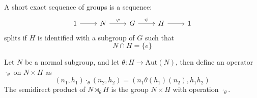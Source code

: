 \documentclass[openany]{book}
\begin{document}
\begin{defn}
    A short exact sequence of groups is a sequence:
    \[\begin{tikzcd}
        1 & N & G & H & 1
        \arrow[from=1-1, to=1-2]
        \arrow["\varphi", from=1-2, to=1-3]
        \arrow["\psi", from=1-3, to=1-4]
        \arrow[from=1-4, to=1-5]
    \end{tikzcd}\]
    splits if $H$ is identified with a subgroup of $G$ such that 
    \begin{equation*}
        N\cap H=\{e\}
    \end{equation*}
\end{defn}


\begin{defn}
    Let $N$ be a normal subgroup, and let $\theta: H\to\text{Aut}(N)$, then define an operator $\cdot_\theta$ on $N\times H$ as 
    \begin{equation*}
        (n_1,h_1)\cdot_\theta(n_2,h_2)=(n_1\theta(h_1)(n_2), h_1h_2)
    \end{equation*}
    The semidirect product of $N\rtimes_\theta H$ is the group $N\times H$ with operation $\cdot_\theta$.
\end{defn}

\end{document}
